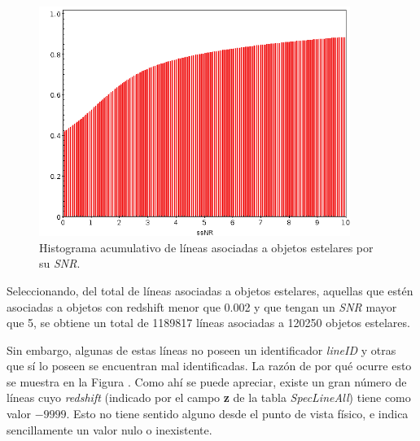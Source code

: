 \begin{figure}[h!]
\begin{center}
\includegraphics[width=0.9\textwidth]{imagenes/stelar_obj_snr_hist.png}
\end{center}
\vspace*{-5mm}
\caption{Histograma acumulativo de líneas asociadas a objetos estelares por su \textit{SNR}.}
\label{fig:stelar_obj_snr}
\end{figure}

Seleccionando, del total de líneas asociadas a objetos estelares, aquellas que estén asociadas a objetos con redshift menor que 0.002 y que tengan un \textit{SNR} mayor que 5, se obtiene un total de 1189817 líneas asociadas a 120250 objetos estelares. 

Sin embargo, algunas de estas líneas no poseen un identificador \textit{lineID} y otras que sí lo poseen se encuentran mal identificadas. La razón de por qué ocurre esto se muestra en la Figura \label{fig:speclinez_hist}. Como ahí se puede apreciar, existe un gran número de líneas cuyo \textit{redshift} (indicado por el campo \textbf{z} de la tabla \textit{SpecLineAll}) tiene como valor ${-9999}$. Esto no tiene sentido alguno desde el punto de vista físico, e indica sencillamente un valor nulo o inexistente.

